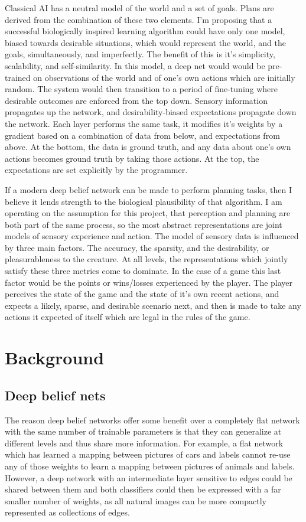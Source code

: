 \documentclass[12pt]{article}
\begin{document}
Classical AI has a neutral model of the world and a set of goals. Plans are derived from the combination of these two elements. I'm proposing that a successful biologically inspired learning algorithm could have only one model, biased towards desirable situations, which would represent the world, and the goals, simultaneously, and imperfectly. The benefit of this is it's simplicity, scalability, and self-similarity. In this model, a deep net would would be pre-trained on observations of the world and of one's own actions which are initially random. The system would then transition to a period of fine-tuning where desirable outcomes are enforced from the top down. Sensory information propagates up the network, and desirability-biased expectations propagate down the network. Each layer performs the same task, it modifies it's weights by a gradient based on a combination of data from below, and expectations from above. At the bottom, the data is ground truth, and any data about one's own actions becomes ground truth by taking those actions. At the top, the expectations are set explicitly by the programmer. 

If a modern deep belief network can be made to perform planning tasks, then I believe it lends strength to the biological plausibility of that algorithm. I am operating on the assumption for this project, that perception and planning are both part of the same process, so the most abstract representations are joint models of sensory experience and action. The model of sensory data is influenced by three main factors. The accuracy, the sparsity, and the desirability, or pleasurableness to the creature. At all levels, the representations which jointly satisfy these three metrics come to dominate. In the case of a game this last factor would be the points or wins/losses experienced by the player. The player perceives the state of the game and the state of it's own recent actions, and expects a likely, sparse, and desirable scenario next, and then is made to take any actions it expected of itself which are legal in the rules of the game. 
		
\section{Background}
	\subsection{Deep belief nets}
	
The reason deep belief networks offer some benefit over a completely flat network with the same number of trainable parameters is that they can generalize at different levels and thus share more information. For example, a flat network which has learned a mapping between pictures of cars and labels cannot re-use any of those weights to learn a mapping between pictures of animals and labels. However, a deep network with an intermediate layer sensitive to edges could be shared between them and both classifiers could then be expressed with a far smaller number of weights, as all natural images can be more compactly represented as collections of edges. 
\end{document}
